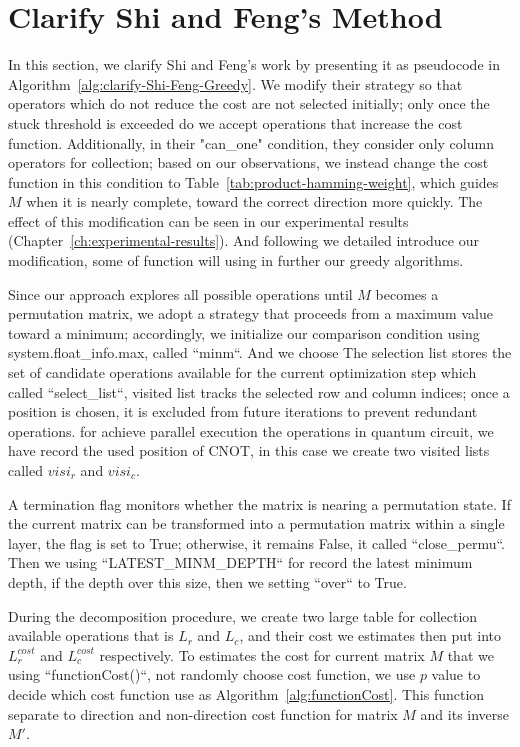 \section{Clarify Shi and Feng's Method}
In this section, we clarify Shi and Feng's work by presenting it 
as pseudocode in Algorithm~\ref{alg:clarify-Shi-Feng-Greedy}. We 
modify their strategy so that operators which do not reduce the 
cost are not selected initially; only once the stuck threshold 
is exceeded do we accept operations that increase the cost 
function. Additionally, in their "can\_one" condition, they 
consider only column operators for collection; based on our 
observations, we instead change the cost function in this 
condition to Table~\ref{tab:product-hamming-weight}, which 
guides $M$ when it is nearly complete, toward the correct 
direction more quickly. The effect of this modification can be 
seen in our experimental results (Chapter~\ref{ch:experimental-results}). 
And following we detailed introduce our modification, some of function 
will using in further our greedy algorithms.

Since our approach explores all possible operations until $M$ becomes a 
permutation matrix, we adopt a strategy that proceeds from a 
maximum value toward a minimum; accordingly, we initialize our 
comparison condition using system.float\_info.max, called 
``minm``. And we choose The selection list stores the set of 
candidate operations available for the current optimization 
step which called ``select\_list``, visited list tracks the 
selected row and column indices; once a position is chosen, 
it is excluded from future iterations to prevent redundant 
operations. for achieve parallel execution the operations in 
quantum circuit, we have record the used position of CNOT, 
in this case we create two visited lists called $visi_{r}$ and $visi_{c}$.

A termination flag monitors whether the matrix is nearing a 
permutation state. If the current matrix can be transformed 
into a permutation matrix within a single layer, the flag is 
set to True; otherwise, it remains False, it called ``close\_permu``. 
Then we using ``LATEST\_MINM\_DEPTH`` for record the latest minimum depth, if the 
depth over this size, then we setting ``over`` to True.

During the decomposition procedure, we create two large table for 
collection available operations that is $L_{r}$ and $L_{c}$, 
and their cost we estimates then put into $L_{r}^{cost}$ and 
$L_{c}^{cost}$ respectively. To estimates the cost for current 
matrix $M$ that we using ``functionCost()``, not randomly choose
cost function, we use $p$ value to decide which cost function use 
as Algorithm~\ref{alg:functionCost}. This function separate to 
direction and non-direction cost function for matrix $M$ and its
inverse $M'$.


